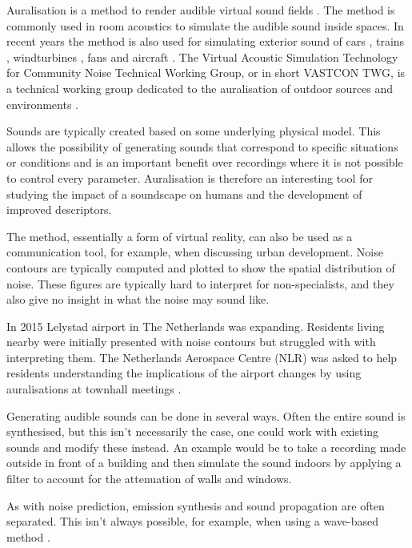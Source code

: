 Auralisation is a method to render audible virtual sound fields \cite{Kleiner1993}.
The method is commonly used in room acoustics to simulate the audible sound inside spaces.
In recent years the method is also used for simulating exterior sound of
cars \cite{Forssen2009,Maillard2012,Pieren2015,Hoffmann2016,Hoffmann2016a},
trains \cite{Pieren2016},
windturbines \cite{Pieren2014,Heutschi2014},
fans \cite{Merino2016} and
aircraft \cite{Arntzen2014a, Rizzi2016a, Rizzi2016}.
The Virtual Acoustic Simulation Technology for Community Noise Technical Working
Group, or in short VASTCON TWG, is a technical working group dedicated to the
auralisation of outdoor sources and environments \cite{Vastcon}.

Sounds are typically created based on some underlying physical model. This
allows the possibility of generating sounds that correspond to specific
situations or conditions and is an important benefit over recordings where it is
not possible to control every parameter. Auralisation is therefore an
interesting tool for studying the impact of a soundscape on humans and the
development of improved descriptors.

The method, essentially a form of virtual reality, can also be used as a
communication tool, for example, when discussing urban development. Noise
contours are typically computed and plotted to show the spatial distribution of
noise. These figures are typically hard to interpret for non-specialists, and
they also give no insight in what the noise may sound like.

In 2015 Lelystad airport in The Netherlands was expanding. Residents living
nearby were initially presented with noise contours but struggled with with
interpreting them. The Netherlands Aerospace Centre (NLR) was asked to help
residents understanding the implications of the airport changes by using
auralisations at townhall meetings \cite{Arntzen2015}.

Generating audible sounds can be done in several ways. Often the entire sound is
synthesised, but this isn't necessarily the case, one could work with existing
sounds and modify these instead. An example would be to take a recording made
outside in front of a building and then simulate the sound indoors by applying a
filter to account for the attenuation of walls and windows.

As with noise prediction, emission synthesis and sound propagation are often
separated. This isn't always possible, for example, when using a wave-based
method \cite{Hornikx2016,Georgiou2016,Georgiou2016a}.

